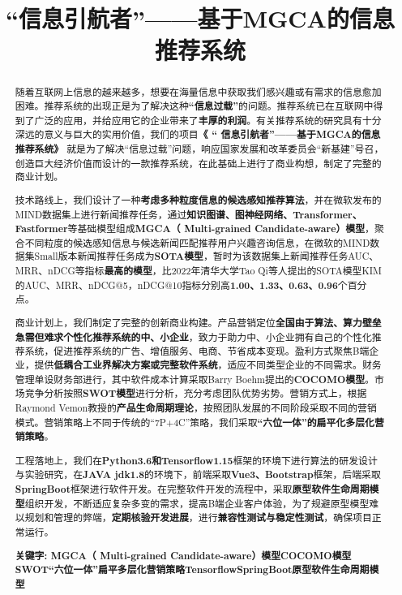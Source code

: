 \documentclass[withoutpreface,bwprint]{cumcmthesis} %
\title{“信息引航者”——基于MGCA的信息推荐系统}
\begin{document}
	
	\maketitle\thispagestyle{empty}
	\begin{abstract}
		随着互联网上信息的越来越多，想要在海量信息中获取我们感兴趣或有需求的信息愈加困难。推荐系统的出现正是为了解决这种\textbf{“信息过载”}的问题。推荐系统已在互联网中得到了广泛的应用，并给应用它的企业带来了\textbf{丰厚的利润}。有关推荐系统的研究具有十分深远的意义与巨大的实用价值，我们的项目\textbf{《 “ 信息引航者”——基于MGCA的信息推荐系统》 }就是为了解决“信息过载”问题，响应国家发展和改革委员会“新基建”号召，创造巨大经济价值而设计的一款推荐系统，在此基础上进行了商业构想，制定了完整的商业计划。\par
		技术路线上，我们设计了一种\textbf{考虑多种粒度信息的候选感知推荐算法}，并在微软发布的MIND数据集上进行新闻推荐任务，通过\textbf{知识图谱、图神经网络、Transformer、Fastformer}等基础模型组成\textbf{MGCA（ Multi-grained Candidate-aware）模型}，聚合不同粒度的候选感知信息与候选新闻匹配推荐用户兴趣咨询信息，在微软的MIND数据集Small版本新闻推荐任务成为\textbf{SOTA模型}，暂时为该数据集上新闻推荐任务AUC、MRR、nDCG等指标\textbf{最高的模型}，比2022年清华大学Tao Qi等人提出的SOTA模型KIM的AUC、MRR、nDCG@5，nDCG@10指标分别高\textbf{1.00、1.33、0.63、0.96}个百分点。\par
		商业计划上，我们制定了完整的创新商业构建。产品营销定位\textbf{全国由于算法、算力壁垒急需但难求个性化推荐系统的中、小企业}，致力于助力中、小企业拥有自己的个性化推荐系统，促进推荐系统的广告、增值服务、电商、节省成本变现。盈利方式聚焦B端企业，提供\textbf{低耦合工业界解决方案或完整软件系统}，适应不同类型企业的不同需求。财务管理单设财务部进行，其中软件成本计算采取Barry Boehm提出的\textbf{COCOMO模型}。市场竞争分析按照\textbf{SWOT模型}进行分析，充分考虑团队优势劣势。营销方式上，根据Raymond Vemon教授的\textbf{产品生命周期理论}，按照团队发展的不同阶段采取不同的营销模式。营销策略上不同于传统的“7P+4C”策略，我们采取\textbf{“六位一体”的扁平化多层化营销策略}。\par
		工程落地上，我们在\textbf{Python3.6和Tensorflow1.15}框架的环境下进行算法的研发设计与实验研究，在\textbf{JAVA jdk1.8}的环境下，前端采取\textbf{Vue3、Bootstrap}框架，后端采取\textbf{SpringBoot}框架进行软件开发。在完整软件开发的流程中，采取\textbf{原型软件生命周期模型}组织开发，不断适应复杂多变的需求，提高B端企业客户体验，为了规避原型模型难以规划和管理的弊端，\textbf{定期核验开发进展}，进行\textbf{兼容性测试与稳定性测试}，确保项目正常运行。\par
		\textbf	{关键字: MGCA（ Multi-grained Candidate-aware）模型\quad  COCOMO模型\quad  SWOT\quad  “六位一体”扁平多层化营销策略\quad   Tensorflow\quad SpringBoot\quad  原型软件生命周期模型\quad	}
	\end{abstract}
	\setcounter{page}{1}
	\tableofcontents
	\newpage
\end{document}
